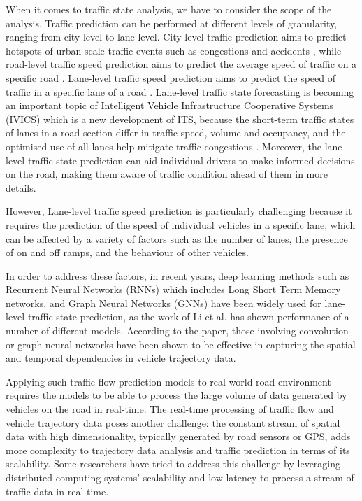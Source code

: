 \documentclass[11pt]{uonthesis}
\begin{document}
When it comes to traffic state analysis, we have to consider the scope of the analysis. Traffic prediction can be performed at different levels of granularity, ranging from city-level to lane-level. City-level traffic prediction aims to predict hotspots of urban-scale traffic events such as congestions \cite{macnnimage} and accidents \cite{Zhou_Wang_Xie_Chen_Liu_2020}, while road-level traffic speed prediction aims to predict the average speed of traffic on a specific road \cite{Sigurdsson2018RoadTC}. Lane-level traffic speed prediction aims to predict the speed of traffic in a specific lane of a road \cite{gcn1}\cite{gcn2}. Lane-level traffic state forecasting is becoming an important topic of Intelligent Vehicle Infrastructure Cooperative Systems (IVICS) which is a new development of ITS, because the short-term traffic states of lanes in a road section differ in traffic speed, volume and occupancy, and the optimised use of all lanes help mitigate traffic congestions \cite{GU20191}. Moreover, the lane-level traffic state prediction can aid individual drivers to make informed decisions on the road, making them aware of traffic condition ahead of them in more details.

However, Lane-level traffic speed prediction is particularly challenging because it requires the prediction of the speed of individual vehicles in a specific lane, which can be affected by a variety of factors such as the number of lanes, the presence of on and off ramps, and the behaviour of other vehicles.

In order to address these factors, in recent years, deep learning methods such as Recurrent Neural Networks (RNNs) which includes Long Short Term Memory networks, and Graph Neural Networks (GNNs) have been widely used for lane-level traffic state prediction, as the work of Li et al. \cite{li2024unifyinglaneleveltrafficprediction} has shown performance of a number of different models. According to the paper, those involving 
convolution or graph neural networks have been shown to be effective in capturing the spatial and temporal dependencies in vehicle trajectory data.

Applying such traffic flow prediction models to real-world road environment requires the models to be able to process the large volume of data generated by vehicles on the road in real-time. The real-time processing of traffic flow and vehicle trajectory data poses another challenge: the constant stream of spatial data with high dimensionality, typically generated by road sensors or GPS, adds more complexity to trajectory data analysis and traffic prediction in terms of its scalability. Some researchers \cite{Sigurdsson2018RoadTC}\cite{9077707}\cite{Yang2019} have tried to address this challenge by leveraging distributed computing systems' scalability and low-latency to process a stream of traffic data in real-time.
\end{document}
